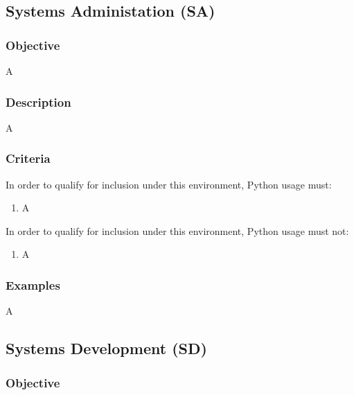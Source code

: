 
	\subsection{Systems Administation (SA)}

		\subsubsection{Objective}

			A

		\subsubsection{Description}

			A

		\subsubsection{Criteria}

			In order to qualify for inclusion under this environment, Python usage must:

			\begin{enumerate}
        		\item A
        	\end{enumerate}

			In order to qualify for inclusion under this environment, Python usage must not:

			\begin{enumerate}
        		\item A
        	\end{enumerate}

		\subsubsection{Examples}

			A


	\subsection{Systems Development (SD)}

		\subsubsection{Objective}

